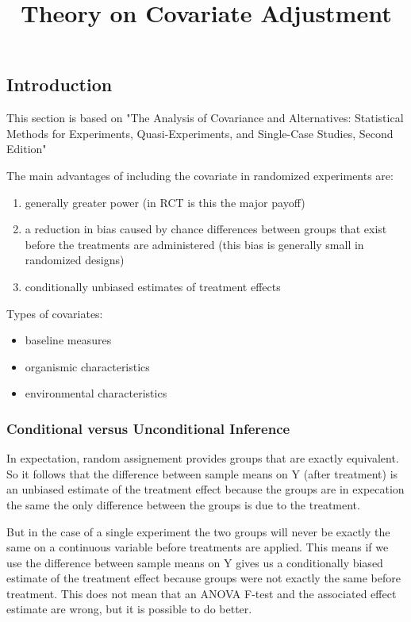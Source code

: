 \documentclass[a4paper]{article}
\title{Theory on Covariate Adjustment}
\begin{document}
\maketitle 
\subsection{Introduction}
This section is based on "The Analysis of Covariance and Alternatives: Statistical Methods for Experiments, Quasi-Experiments, and Single-Case Studies, Second Edition"

The main advantages of including the covariate in randomized experiments are: 
\begin{enumerate}
  \item generally greater power (in RCT is this the major payoff)
  \item a reduction in bias caused by chance differences between groups that exist before the treatments are administered (this bias is generally small in randomized designs) 
  \item conditionally unbiased estimates of treatment effects 
\end{enumerate}

Types of covariates: 
\begin{itemize}
  \item baseline measures 
  \item organismic characteristics 
  \item environmental characteristics 
\end{itemize}

\subsubsection*{Conditional versus Unconditional Inference}
In expectation, random assignement provides groups that are exactly equivalent. So it follows that the difference between sample  means on Y (after treatment) is an unbiased estimate of the treatment effect because the groups are in expecation the same the only difference between the groups is due to the treatment.

But in the case of a single experiment the two groups will never be exactly the same on a continuous variable before treatments are applied. This means if we use the difference between sample means on Y gives us a conditionally biased estimate of the treatment effect because groups were not exactly the same before treatment. This does not mean that an ANOVA F-test and the associated effect estimate are wrong, but it is possible to do better.
\end{document}
